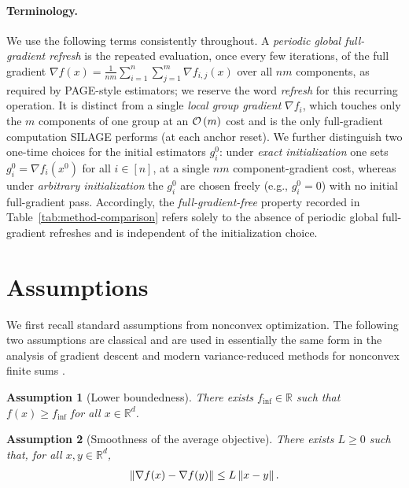 \documentclass{article}
\newcommand{\bb}{\mathbb}
\newcommand{\R}{\bb R}
\newcommand{\norm}[1]{\left\| #1 \right\|}
\newcommand{\cO}{{\cal O}}
\newcommand{\finf}{f_\mathrm{inf}}
\newcommand{\rb}[1]{\left(#1\right)}
\theoremstyle{plain}
\newtheorem{assumption}{Assumption}
\newcommand{\algname}[1]{{\sf\scalefont{0.88}\color{mydarkgreen}#1}\xspace}
\def\algname#1{#1}%
\newcommand{\squeeze}{\textstyle}
\begin{document}
\paragraph{Terminology.}
We use the following terms consistently throughout. A \emph{periodic global full-gradient refresh} is the repeated evaluation, once every few iterations, of the full gradient $\nabla f(x)=\frac{1}{nm}\sum_{i=1}^{n}\sum_{j=1}^{m}\nabla f_{i,j}(x)$ over all $nm$ components, as required by \algname{PAGE}-style estimators; we reserve the word \emph{refresh} for this recurring operation. It is distinct from a single \emph{local group gradient} $\nabla f_i$, which touches only the $m$ components of one group at an $\cO\rb{m}$ cost and is the only full-gradient computation \algname{SILAGE} performs (at each anchor reset). We further distinguish two one-time choices for the initial estimators $g_i^0$: under \emph{exact initialization} one sets $g_i^0=\nabla f_i(x^0)$ for all $i\in[n]$, at a single $nm$ component-gradient cost, whereas under \emph{arbitrary initialization} the $g_i^0$ are chosen freely (e.g., $g_i^0=0$) with no initial full-gradient pass. Accordingly, the \emph{full-gradient-free} property recorded in Table~\ref{tab:method-comparison} refers solely to the absence of periodic global full-gradient refreshes and is independent of the initialization choice.

\section{Assumptions}\label{sec:assumptions}

We first recall standard assumptions from nonconvex optimization. The following two assumptions are classical and are used in essentially the same form in the analysis of gradient descent and modern variance-reduced methods for nonconvex finite sums \citep{nes04, li21, li2021zerosarah, PAGE-AB}.

\begin{assumption}[Lower boundedness]\label{ass:lower-bounded}
There exists $\finf\in\R$ such that $f(x)\ge \finf$ for all $x\in\R^d$.
\end{assumption}

\begin{assumption}[Smoothness of the average objective]\label{ass:f-smooth}
There exists $L\ge 0$ such that, for all $x,y\in\R^d$,
\begin{align}
    \squeeze
    \norm{\nabla f(x)-\nabla f(y)}\le L\norm{x-y}.
    \notag
\end{align}
\end{assumption}
\end{document}
